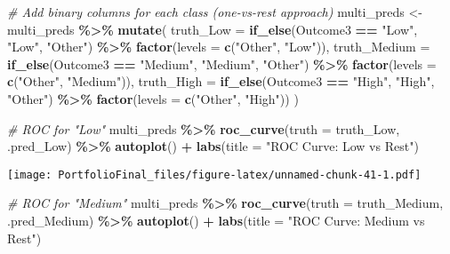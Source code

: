\documentclass[
]{article}
\newenvironment{Shaded}{\begin{snugshade}}{\end{snugshade}}
\newcommand{\AttributeTok}[1]{\textcolor[rgb]{0.13,0.29,0.53}{#1}}
\newcommand{\CommentTok}[1]{\textcolor[rgb]{0.56,0.35,0.01}{\textit{#1}}}
\newcommand{\FunctionTok}[1]{\textcolor[rgb]{0.13,0.29,0.53}{\textbf{#1}}}
\newcommand{\NormalTok}[1]{#1}
\newcommand{\OtherTok}[1]{\textcolor[rgb]{0.56,0.35,0.01}{#1}}
\newcommand{\SpecialCharTok}[1]{\textcolor[rgb]{0.81,0.36,0.00}{\textbf{#1}}}
\newcommand{\StringTok}[1]{\textcolor[rgb]{0.31,0.60,0.02}{#1}}
\begin{document}
\begin{Shaded}
\begin{Highlighting}[]
\CommentTok{\# Add binary columns for each class (one{-}vs{-}rest approach)}
\NormalTok{multi\_preds }\OtherTok{\textless{}{-}}\NormalTok{ multi\_preds }\SpecialCharTok{\%\textgreater{}\%}
  \FunctionTok{mutate}\NormalTok{(}
    \AttributeTok{truth\_Low =} \FunctionTok{if\_else}\NormalTok{(Outcome3 }\SpecialCharTok{==} \StringTok{"Low"}\NormalTok{, }\StringTok{"Low"}\NormalTok{, }\StringTok{"Other"}\NormalTok{) }\SpecialCharTok{\%\textgreater{}\%} \FunctionTok{factor}\NormalTok{(}\AttributeTok{levels =} \FunctionTok{c}\NormalTok{(}\StringTok{"Other"}\NormalTok{, }\StringTok{"Low"}\NormalTok{)),}
    \AttributeTok{truth\_Medium =} \FunctionTok{if\_else}\NormalTok{(Outcome3 }\SpecialCharTok{==} \StringTok{"Medium"}\NormalTok{, }\StringTok{"Medium"}\NormalTok{, }\StringTok{"Other"}\NormalTok{) }\SpecialCharTok{\%\textgreater{}\%} \FunctionTok{factor}\NormalTok{(}\AttributeTok{levels =} \FunctionTok{c}\NormalTok{(}\StringTok{"Other"}\NormalTok{, }\StringTok{"Medium"}\NormalTok{)),}
    \AttributeTok{truth\_High =} \FunctionTok{if\_else}\NormalTok{(Outcome3 }\SpecialCharTok{==} \StringTok{"High"}\NormalTok{, }\StringTok{"High"}\NormalTok{, }\StringTok{"Other"}\NormalTok{) }\SpecialCharTok{\%\textgreater{}\%} \FunctionTok{factor}\NormalTok{(}\AttributeTok{levels =} \FunctionTok{c}\NormalTok{(}\StringTok{"Other"}\NormalTok{, }\StringTok{"High"}\NormalTok{))}
\NormalTok{  )}
\end{Highlighting}
\end{Shaded}

\begin{Shaded}
\begin{Highlighting}[]
\CommentTok{\# ROC for "Low"}
\NormalTok{multi\_preds }\SpecialCharTok{\%\textgreater{}\%}
  \FunctionTok{roc\_curve}\NormalTok{(}\AttributeTok{truth =}\NormalTok{ truth\_Low, .pred\_Low) }\SpecialCharTok{\%\textgreater{}\%}
  \FunctionTok{autoplot}\NormalTok{() }\SpecialCharTok{+}
  \FunctionTok{labs}\NormalTok{(}\AttributeTok{title =} \StringTok{"ROC Curve: Low vs Rest"}\NormalTok{)}
\end{Highlighting}
\end{Shaded}

\texttt{[image: PortfolioFinal\_files/figure-latex/unnamed-chunk-41-1.pdf]}

\begin{Shaded}
\begin{Highlighting}[]
\CommentTok{\# ROC for "Medium"}
\NormalTok{multi\_preds }\SpecialCharTok{\%\textgreater{}\%}
  \FunctionTok{roc\_curve}\NormalTok{(}\AttributeTok{truth =}\NormalTok{ truth\_Medium, .pred\_Medium) }\SpecialCharTok{\%\textgreater{}\%}
  \FunctionTok{autoplot}\NormalTok{() }\SpecialCharTok{+}
  \FunctionTok{labs}\NormalTok{(}\AttributeTok{title =} \StringTok{"ROC Curve: Medium vs Rest"}\NormalTok{)}
\end{Highlighting}
\end{Shaded}
\end{document}
